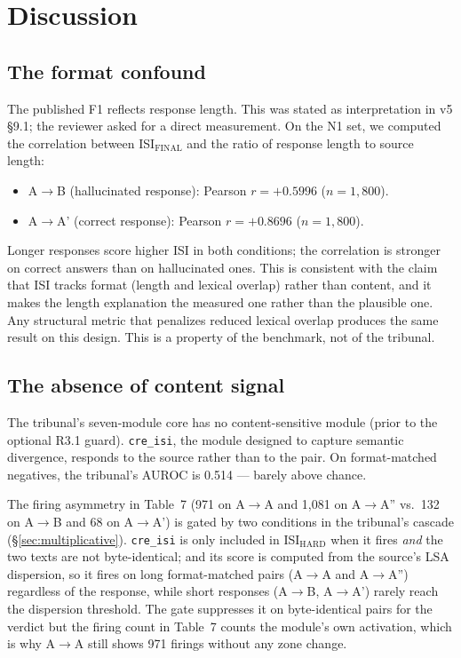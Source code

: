 \documentclass[11pt,a4paper]{article}
\begin{document}
\section{Discussion}

\subsection{The format confound}
The published F1 reflects response length. This was stated as interpretation in v5 \S9.1; the reviewer asked for a direct measurement. On the N1 set, we computed the correlation between ISI$_{\text{FINAL}}$ and the ratio of response length to source length:\begin{itemize}
    \item A$\rightarrow$B (hallucinated response): Pearson $r = +0.5996$ ($n = 1{,}800$).
    \item A$\rightarrow$A' (correct response): Pearson $r = +0.8696$ ($n = 1{,}800$).
\end{itemize}
Longer responses score higher ISI in both conditions; the correlation is stronger on correct answers than on hallucinated ones. This is consistent with the claim that ISI tracks format (length and lexical overlap) rather than content, and it makes the length explanation the measured one rather than the plausible one. Any structural metric that penalizes reduced lexical overlap produces the same result on this design. This is a property of the benchmark, not of the tribunal.

\subsection{The absence of content signal}
The tribunal's seven-module core has no content-sensitive module (prior to the optional R3.1 guard). \texttt{cre\_isi}, the module designed to capture semantic divergence, responds to the source rather than to the pair. On format-matched negatives, the tribunal's AUROC is 0.514 --- barely above chance.

The firing asymmetry in Table~7 (971 on A$\rightarrow$A and 1{,}081 on A$\rightarrow$A'' vs.\ 132 on A$\rightarrow$B and 68 on A$\rightarrow$A') is gated by two conditions in the tribunal's cascade (\S\ref{sec:multiplicative}). \texttt{cre\_isi} is only included in ISI$_{\text{HARD}}$ when it fires \emph{and} the two texts are not byte-identical; and its score is computed from the source's LSA dispersion, so it fires on long format-matched pairs (A$\rightarrow$A and A$\rightarrow$A'') regardless of the response, while short responses (A$\rightarrow$B, A$\rightarrow$A') rarely reach the dispersion threshold. The gate suppresses it on byte-identical pairs for the verdict but the firing count in Table~7 counts the module's own activation, which is why A$\rightarrow$A still shows 971 firings without any zone change.
\end{document}
